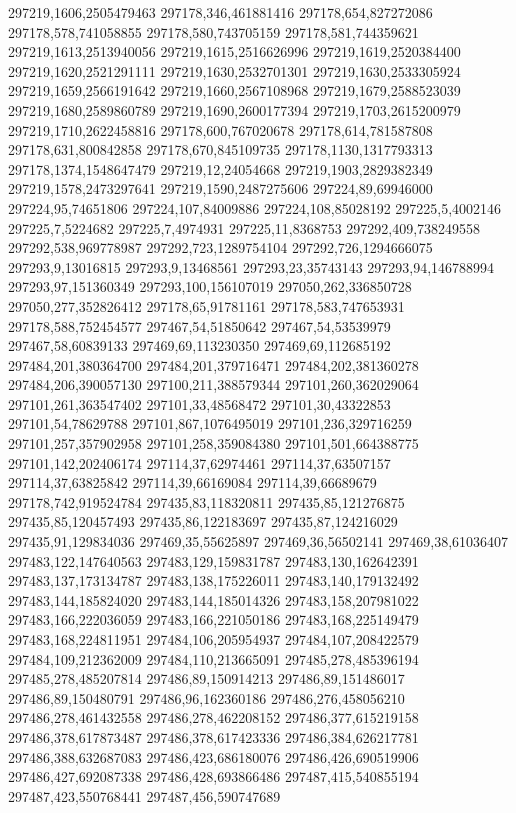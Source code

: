 297219,1606,2505479463
297178,346,461881416
297178,654,827272086
297178,578,741058855
297178,580,743705159
297178,581,744359621
297219,1613,2513940056
297219,1615,2516626996
297219,1619,2520384400
297219,1620,2521291111
297219,1630,2532701301
297219,1630,2533305924
297219,1659,2566191642
297219,1660,2567108968
297219,1679,2588523039
297219,1680,2589860789
297219,1690,2600177394
297219,1703,2615200979
297219,1710,2622458816
297178,600,767020678
297178,614,781587808
297178,631,800842858
297178,670,845109735
297178,1130,1317793313
297178,1374,1548647479
297219,12,24054668
297219,1903,2829382349
297219,1578,2473297641
297219,1590,2487275606
297224,89,69946000
297224,95,74651806
297224,107,84009886
297224,108,85028192
297225,5,4002146
297225,7,5224682
297225,7,4974931
297225,11,8368753
297292,409,738249558
297292,538,969778987
297292,723,1289754104
297292,726,1294666075
297293,9,13016815
297293,9,13468561
297293,23,35743143
297293,94,146788994
297293,97,151360349
297293,100,156107019
297050,262,336850728
297050,277,352826412
297178,65,91781161
297178,583,747653931
297178,588,752454577
297467,54,51850642
297467,54,53539979
297467,58,60839133
297469,69,113230350
297469,69,112685192
297484,201,380364700
297484,201,379716471
297484,202,381360278
297484,206,390057130
297100,211,388579344
297101,260,362029064
297101,261,363547402
297101,33,48568472
297101,30,43322853
297101,54,78629788
297101,867,1076495019
297101,236,329716259
297101,257,357902958
297101,258,359084380
297101,501,664388775
297101,142,202406174
297114,37,62974461
297114,37,63507157
297114,37,63825842
297114,39,66169084
297114,39,66689679
297178,742,919524784
297435,83,118320811
297435,85,121276875
297435,85,120457493
297435,86,122183697
297435,87,124216029
297435,91,129834036
297469,35,55625897
297469,36,56502141
297469,38,61036407
297483,122,147640563
297483,129,159831787
297483,130,162642391
297483,137,173134787
297483,138,175226011
297483,140,179132492
297483,144,185824020
297483,144,185014326
297483,158,207981022
297483,166,222036059
297483,166,221050186
297483,168,225149479
297483,168,224811951
297484,106,205954937
297484,107,208422579
297484,109,212362009
297484,110,213665091
297485,278,485396194
297485,278,485207814
297486,89,150914213
297486,89,151486017
297486,89,150480791
297486,96,162360186
297486,276,458056210
297486,278,461432558
297486,278,462208152
297486,377,615219158
297486,378,617873487
297486,378,617423336
297486,384,626217781
297486,388,632687083
297486,423,686180076
297486,426,690519906
297486,427,692087338
297486,428,693866486
297487,415,540855194
297487,423,550768441
297487,456,590747689
